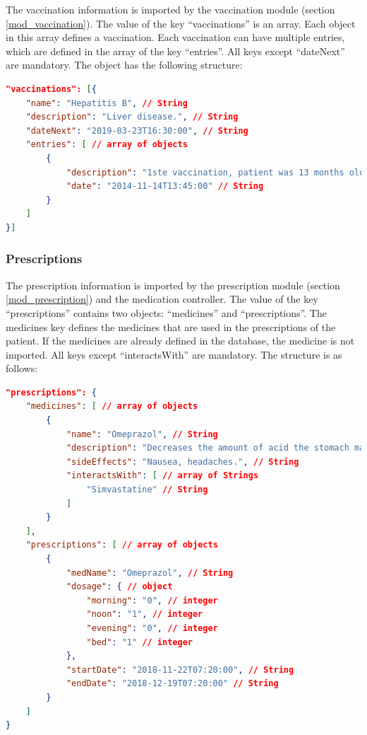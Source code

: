     The vaccination information is imported by the vaccination module (section \ref{mod_vaccination}). The value of the key ``vaccinations'' is an array. Each object in this array defines a vaccination. Each vaccination can have multiple entries, which are defined in the array of the key ``entries''. All keys except ``dateNext'' are mandatory. The object has the following structure:

\begin{lstlisting}[language=json,firstnumber=1]
"vaccinations": [{
    "name": "Hepatitis B", // String
    "description": "Liver disease.", // String
    "dateNext": "2019-03-23T16:30:00", // String
    "entries": [ // array of objects
        {
            "description": "1ste vaccination, patient was 13 months old.", // String
            "date": "2014-11-14T13:45:00" // String
        }
    ]
}]
\end{lstlisting}

    \subsubsection{Prescriptions}

    The prescription information is imported by the prescription module (section
    \ref{mod_prescription}) and the medication controller. The value of the key ``prescriptions'' contains two objects: ``medicines'' and ``prescriptions''. The medicines key defines the medicines that are used in the prescriptions of the patient. If the medicines are already defined in the database, the medicine is not imported. All keys except ``interactsWith'' are mandatory. The structure is as follows:

\begin{lstlisting}[language=json,firstnumber=1]
"prescriptions": {
    "medicines": [ // array of objects
        {
            "name": "Omeprazol", // String
            "description": "Decreases the amount of acid the stomach makes.", // String
            "sideEffects": "Nausea, headaches.", // String
            "interactsWith": [ // array of Strings
                "Simvastatine" // String
            ]
        }
    ],
    "prescriptions": [ // array of objects
        {
            "medName": "Omeprazol", // String
            "dosage": { // object
                "morning": "0", // integer
                "noon": "1", // integer
                "evening": "0", // integer
                "bed": "1" // integer
            },
            "startDate": "2018-11-22T07:20:00", // String
            "endDate": "2018-12-19T07:20:00" // String
        }
    ]
}
\end{lstlisting}


